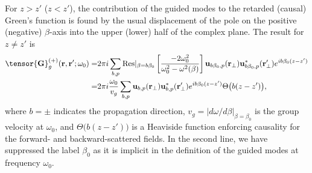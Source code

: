 \documentclass[preprint, aps,pra,onecolumn]{revtex4-1} %
\begin{document}
For $z>z'$ ($z<z'$), the contribution of the guided modes to the retarded (causal) Green's function is found by the 
usual displacement of the pole on the positive (negative) $\beta$-axis into the upper (lower) half of 
the complex plane. The result for $z \neq z'$ is \cite{manga_rao_single_2007}
	\begin{align} 
		\tensor{\mathbf{G}}^{(+)}_g(\br,\br'; \omega_0) = &2\pi i \sum_{b,p}  {\rm Res}\vert_{\beta =b\beta_0} 
\left[\frac{-2 \omega_0^2 }{ \omega_0^2-\omega^2(\beta)}\right]  \mathbf{u}_{b\beta_0, p} 
(\br_\perp)\mathbf{u}^*_{b\beta_0, p} (\br_{\perp}^\prime)e^{ib \beta_0 (z-z')} \nonumber \\
= & 2\pi i \frac{\omega_0}{v_g } \sum_{b,p} \mathbf{u}_{b, p} (\br_\perp)\mathbf{u}^*_{b, p} 
(\br_{\perp}^\prime) e^{i b\beta_0(z-z')} \Theta \big( b(z-z') \big), \label{Eq::GreensGuided}
	\end{align}
where $b=\pm$ indicates the propagation direction, $v_g= \vert d\omega/d\beta \vert_{\beta=\beta_0}$ is the group velocity at $\omega_0$, and $\Theta \big( b(z-z') \big)$ is a Heaviside function enforcing causality for the forward- and backward-scattered fields. In the second line, we have suppressed the label $\beta_0$ as it is implicit in the definition of the guided modes at frequency $\omega_0$. 
\end{document}
